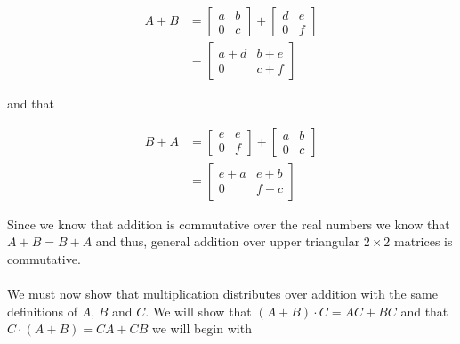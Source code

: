 \documentclass{article}
\begin{document}
    \begin{equation*}
      \begin{split}
        A + B &= \begin{bmatrix}
          a & b\\
          0 & c
        \end{bmatrix} + 
        \begin{bmatrix}
          d & e\\
          0 & f
        \end{bmatrix}\\
        &= \begin{bmatrix}
          a+d & b+e\\
          0 & c+f
        \end{bmatrix}
      \end{split}
    \end{equation*}

    \noindent and that 

    \begin{equation*}
      \begin{split}
        B + A &= \begin{bmatrix}
          e & e\\
          0 & f
        \end{bmatrix} + 
        \begin{bmatrix}
          a & b\\
          0 & c
        \end{bmatrix}\\
        &= \begin{bmatrix}
          e+a & e+b\\
          0 & f+c
        \end{bmatrix}
      \end{split}
    \end{equation*}

    Since we know that addition is commutative over the real numbers we know that $A+B = B+A$ and thus, general addition over upper triangular $2 \times 2$ matrices is commutative. 

    \paragraph{}
    We must now show that multiplication distributes over addition with the same definitions of $A$, $B$ and $C$. We will show that $(A+B) \cdot C = AC + BC$ and that $C \cdot (A+B) = CA + CB$ we will begin with
\end{document}
